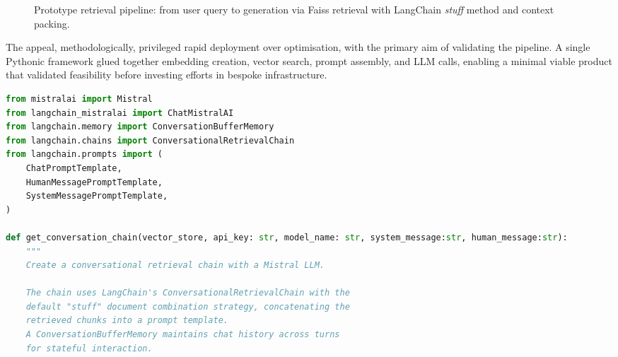 \begin{spacing}{1.5}
\begin{figure}[H]
\begin{adjustbox}{max width=0.8\linewidth, center}
\end{adjustbox}
\caption{Prototype retrieval pipeline: from user query to generation via Faiss retrieval with LangChain \textit{stuff} method and context packing.}
\label{fig:prototype-pipeline}
\end{figure}

The appeal, methodologically, privileged rapid deployment over optimisation, with the primary aim of validating the pipeline. A single Pythonic framework glued together embedding creation, vector search, prompt assembly, and LLM calls, enabling a minimal viable product that validated feasibility before investing efforts in bespoke infrastructure.


\begin{lstlisting}[language=Python, 
                  breaklines=true,
                  frame=none, 
                  showspaces=false,
                  showstringspaces=false,
                  showtabs=false,
                  caption={Usage example in Python of the stuff method from LangChain.}, 
                  captionpos=b, 
                  label={lst:stuff-method},
                  xleftmargin=0.1\textwidth,
                  xrightmargin=0.1\textwidth,
                  basicstyle=\fontsize{9}{10.5}\selectfont\ttfamily]
from mistralai import Mistral
from langchain_mistralai import ChatMistralAI
from langchain.memory import ConversationBufferMemory
from langchain.chains import ConversationalRetrievalChain
from langchain.prompts import (
    ChatPromptTemplate,
    HumanMessagePromptTemplate,
    SystemMessagePromptTemplate,
)

def get_conversation_chain(vector_store, api_key: str, model_name: str, system_message:str, human_message:str):
    """
    Create a conversational retrieval chain with a Mistral LLM.

    The chain uses LangChain's ConversationalRetrievalChain with the 
    default "stuff" document combination strategy, concatenating the 
    retrieved chunks into a prompt template. 
    A ConversationBufferMemory maintains chat history across turns 
    for stateful interaction.


\end{lstlisting}
\end{spacing}
